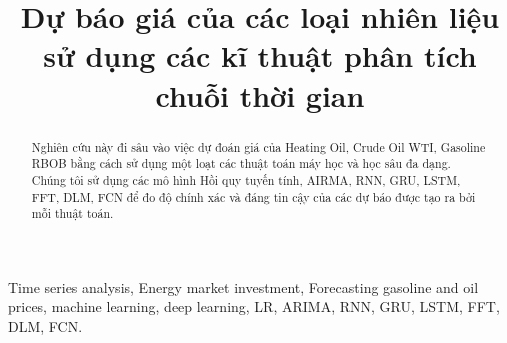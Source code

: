 \documentclass[conference]{IEEEtran}
\begin{document}
\title{Dự báo giá của các loại nhiên liệu sử dụng các kĩ thuật phân tích chuỗi thời gian\\
}

\author{
\and
{}
\and
{}
\and
\hspace{2.5cm}
\and
{}
}

\maketitle

\begin{abstract}
Nghiên cứu này đi sâu vào việc dự đoán giá của Heating Oil, Crude Oil WTI, Gasoline RBOB bằng cách sử dụng một loạt các thuật toán máy học và học sâu đa dạng. Chúng tôi sử dụng các mô hình Hồi quy tuyến tính, AIRMA, RNN, GRU, LSTM, FFT, DLM, FCN để đo độ chính xác và đáng tin cậy của các dự báo được tạo ra bởi mỗi thuật toán.
\end{abstract}

\begin{IEEEkeywords}
Time series analysis, Energy market investment, Forecasting gasoline and oil prices, machine learning, deep learning, LR, ARIMA, RNN, GRU, LSTM, FFT, DLM, FCN.\end{IEEEkeywords}
\end{document}
